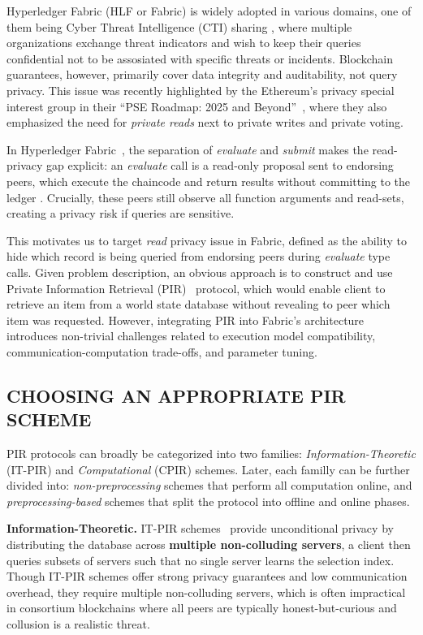 \documentclass[letterpaper,journal]{IEEEtran}
\begin{document}
Hyperledger Fabric (HLF or Fabric) is widely adopted in various domains, one of them being Cyber Threat Intelligence (CTI) sharing
\cite{dunnett_trusted_2022, huff_distributed_2021, allouche_trade_2021, gong_blocis_2020}, where multiple organizations 
exchange threat indicators and wish to keep their queries confidential not to be assosiated with specific threats or incidents.
Blockchain guarantees, however, primarily cover data integrity and auditability, not query privacy.
This issue was recently highlighted by the Ethereum's privacy special interest group in their
``PSE Roadmap: 2025 and Beyond''~\cite{ethereum_pse_2025}, where they also 
emphasized the need for \emph{private reads} next to private writes and private voting.

In Hyperledger Fabric~\cite{androulaki_hyperledger_2018}, the separation of \emph{evaluate} and \emph{submit} 
makes the read-privacy gap explicit: an \emph{evaluate} call is a read-only proposal sent to endorsing peers, 
which execute the chaincode and return results without committing to the ledger \cite{fabric_docs_a_nodate}.
Crucially, these peers still observe all function arguments and read-sets, creating a privacy risk if queries are sensitive.

This motivates us to target \emph{read} privacy issue in Fabric, defined as the ability to 
hide which record is being queried from endorsing peers during \emph{evaluate} type calls. 
Given problem description, an obvious approach is to construct and use Private Information Retrieval (PIR)~\cite{chor_private_1998} 
protocol, which would enable client to retrieve an item from a world state database without revealing to peer which item was requested. 
However, integrating PIR into Fabric's architecture introduces non-trivial challenges related to execution model compatibility,
communication-computation trade-offs, and parameter tuning.

\subsection{CHOOSING AN APPROPRIATE PIR SCHEME}
PIR protocols can broadly be categorized into two families: \emph{Information-Theoretic} (IT-PIR) and \emph{Computational} (CPIR) schemes. Later,
each familly can be further divided into: \emph{non-preprocessing} schemes that perform all computation online, 
and \emph{preprocessing-based} schemes that split the protocol into offline and online phases.

\textbf{Information-Theoretic.} IT-PIR schemes~\cite{chor_private_1998,beimel_breaking_2002,goldberg_improving_2007,devet_optimally_2012,demmler_raid_pir_2014} 
provide unconditional privacy by distributing the database across \textbf{multiple non-colluding servers}, a client then queries subsets of 
servers such that no single server learns the selection index. 
Though IT-PIR schemes offer strong privacy guarantees and low communication overhead, they require multiple non-colluding servers,
which is often impractical in consortium blockchains where all peers are typically honest-but-curious and collusion is a realistic threat.
\end{document}
